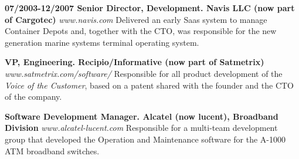 \documentclass{res}
\begin{document}
\begin{resume}
{\bf 07/2003-12/2007 Senior Director, Development. Navis LLC (now part of Cargotec)}
{\it www.navis.com}  Delivered an early Saas system to manage Container Depots and, together with the CTO, was responsible for the new generation marine systems terminal operating system.
\begin{comment}
\begin{itemize}
    \item Responsible for new generation marine systems (Container Terminal Management)
    \item Delivered an early Saas system to manage Container Depots.
    \item Initiated a Business Intelligence Solution integrated with the core terminal management software.
    \item Lead a development group with multiple teams, distributed between California and Chennai (India).
    \item Defined the “Go To Market” process that was adopted by the engineering organization as the standard development process.
\end{itemize}
\end{comment}

{\bf VP, Engineering. Recipio/Informative (now part of Satmetrix)}
{\it www.satmetrix.com/software/}
Responsible for all product development of the {\em Voice of the Customer}, based on a patent shared with the founder and the CTO of the company. 
\begin{comment}
\begin{itemize}
    \item Delivered the solution (Saas) to large customer oriented enterprises, including NBC, Procter and Gamble, General Motors and Lego.
    \item Managed the integration of the technical teams through the acquisition of Recipio by Informative.
\end{itemize}
\end{comment}

{\bf Software Development Manager. Alcatel (now lucent), Broadband Division}
{\it www.alcatel-lucent.com}
Responsible for a multi-team development group that developed the Operation and Maintenance software for the A-1000 ATM broadband switches.
\begin{comment}
\begin{itemize}
    \item Delivered the Operation and Maintenance Software for the first generation of A-1000 ATM switches
    \item Member of the corporate systems architecture for the A-1000 ATM broadband switches.
\end{itemize}
\end{comment}


\end{resume}
\end{document}
